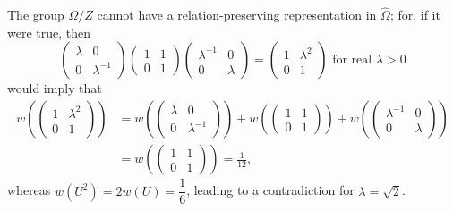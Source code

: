 The group $\Omega/Z$ cannot have a relation-preserving representation
in $\hat{\Omega}$; for, if it were true, then 
$$
\begin{pmatrix}
\lambda & 0\\
0 & \lambda^{-1}
\end{pmatrix} \begin{pmatrix}
1&1\\0&1
\end{pmatrix} \begin{pmatrix}
\lambda^{-1} & 0\\
0 & \lambda
\end{pmatrix} = \begin{pmatrix}
1 & \lambda^2\\
0 & 1
\end{pmatrix} \text{ for real } \lambda > 0
$$
would imply that
\begin{align*}
w(\begin{pmatrix}
1&\lambda^2\\0&1
\end{pmatrix}) & = w(\begin{pmatrix}
\lambda & 0\\0 & \lambda^{-1}
\end{pmatrix}) + w (\begin{pmatrix}
1&1\\0&1
\end{pmatrix}) + w (\begin{pmatrix}
\lambda^{-1} & 0\\
0 & \lambda
\end{pmatrix})\\
& = w(\begin{pmatrix}
1&1\\0&1
\end{pmatrix}) = \frac{1}{12}, 
\end{align*}
whereas \pageoriginale $w(U^2)=2w(U)=\dfrac{1}{6}$, leading to a
contradiction for $\lambda=\surd 2$.

